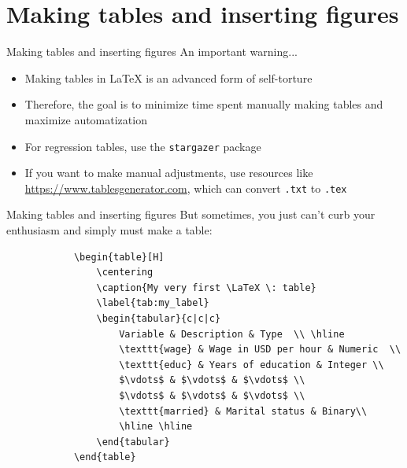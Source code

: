 \documentclass[10pt]{beamer}
\begin{document}
\section*{Making tables and inserting figures}
\begin{frame}{Making tables and inserting figures}
    An important \alert{warning}...
    \begin{itemize}
        \item<2-> Making tables in \LaTeX \: is an advanced form of self-torture
        \item<3-> Therefore, the goal is to minimize time spent manually making tables and \alert{maximize automatization}
        \item<4-> For regression tables, use the \texttt{stargazer} package
        \item<5-> If you want to make manual adjustments, use resources like \href{https://www.tablesgenerator.com}{\color{blue}https://www.tablesgenerator.com}, which can convert \texttt{.txt} to \texttt{.tex}
    \end{itemize}
\end{frame}

\begin{frame}[fragile]{Making tables and inserting figures}
    But sometimes, you just can't curb your enthusiasm and simply must make a table:
        \begin{center}
        \begin{lstlisting}
            \begin{table}[H]
                \centering
                \caption{My very first \LaTeX \: table}
                \label{tab:my_label}
                \begin{tabular}{c|c|c}
                    Variable & Description & Type  \\ \hline
                    \texttt{wage} & Wage in USD per hour & Numeric  \\
                    \texttt{educ} & Years of education & Integer \\
                    $\vdots$ & $\vdots$ & $\vdots$ \\
                    $\vdots$ & $\vdots$ & $\vdots$ \\
                    \texttt{married} & Marital status & Binary\\
                    \hline \hline 
                \end{tabular}
            \end{table}
        \end{lstlisting}
        \end{center}
    \end{frame}
\end{document}
